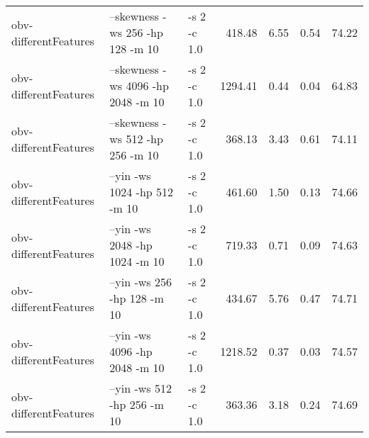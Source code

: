\documentclass[11pt,a4paper]{article}
\begin{document}
\begin{tabular}{lllrrrr}
 obv-differentFeatures  &  --skewness -ws 256 -hp 128 -m 10                                                                                   &  -s 2 -c 1.0  &   418.48  &    6.55  &   0.54  &  74.22  \\
 obv-differentFeatures  &  --skewness -ws 4096 -hp 2048 -m 10                                                                                 &  -s 2 -c 1.0  &  1294.41  &    0.44  &   0.04  &  64.83  \\
 obv-differentFeatures  &  --skewness -ws 512 -hp 256 -m 10                                                                                   &  -s 2 -c 1.0  &   368.13  &    3.43  &   0.61  &  74.11  \\
 obv-differentFeatures  &  --yin -ws 1024 -hp 512 -m 10                                                                                       &  -s 2 -c 1.0  &   461.60  &    1.50  &   0.13  &  74.66  \\
 obv-differentFeatures  &  --yin -ws 2048 -hp 1024 -m 10                                                                                      &  -s 2 -c 1.0  &   719.33  &    0.71  &   0.09  &  74.63  \\
 obv-differentFeatures  &  --yin -ws 256 -hp 128 -m 10                                                                                        &  -s 2 -c 1.0  &   434.67  &    5.76  &   0.47  &  74.71  \\
 obv-differentFeatures  &  --yin -ws 4096 -hp 2048 -m 10                                                                                      &  -s 2 -c 1.0  &  1218.52  &    0.37  &   0.03  &  74.57  \\
 obv-differentFeatures  &  --yin -ws 512 -hp 256 -m 10                                                                                        &  -s 2 -c 1.0  &   363.36  &    3.18  &   0.24  &  74.69  \\
\end{tabular}
\end{document}
